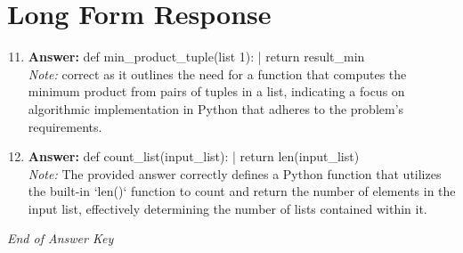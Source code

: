 \documentclass[12pt]{article}
\begin{document}
\section*{Long Form Response}
\begin{enumerate}[label=\arabic*.]
\setcounter{enumi}{10}
\item \textbf{Answer:} def min\_product\_tuple(list 1): | return result\_min
\\ \textit{Note:} correct as it outlines the need for a function that computes the minimum product from pairs of tuples in a list, indicating a focus on algorithmic implementation in Python that adheres to the problem's requirements.
\item \textbf{Answer:} def count\_list(input\_list): | return len(input\_list)
\\ \textit{Note:} The provided answer correctly defines a Python function that utilizes the built-in `len()` function to count and return the number of elements in the input list, effectively determining the number of lists contained within it.
\end{enumerate}

\vfill
\noindent\textit{End of Answer Key}
\end{document}
